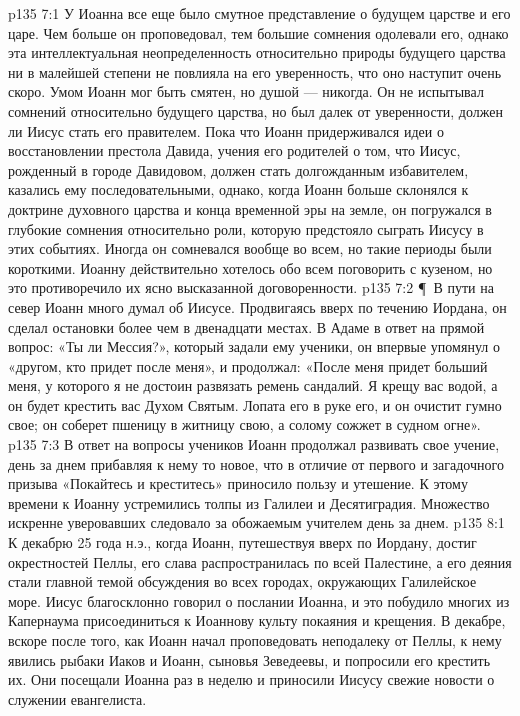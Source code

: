 \vs p135 7:1 У Иоанна все еще было смутное представление о будущем царстве и его царе. Чем больше он проповедовал, тем большие сомнения одолевали его, однако эта интеллектуальная неопределенность относительно природы будущего царства ни в малейшей степени не повлияла на его уверенность, что оно наступит очень скоро. Умом Иоанн мог быть смятен, но душой --- никогда. Он не испытывал сомнений относительно будущего царства, но был далек от уверенности, должен ли Иисус стать его правителем. Пока что Иоанн придерживался идеи о восстановлении престола Давида, учения его родителей о том, что Иисус, рожденный в городе Давидовом, должен стать долгожданным избавителем, казались ему последовательными, однако, когда Иоанн больше склонялся к доктрине духовного царства и конца временной эры на земле, он погружался в глубокие сомнения относительно роли, которую предстояло сыграть Иисусу в этих событиях. Иногда он сомневался вообще во всем, но такие периоды были короткими. Иоанну действительно хотелось обо всем поговорить с кузеном, но это противоречило их ясно высказанной договоренности.
\vs p135 7:2 \P\ В пути на север Иоанн много думал об Иисусе. Продвигаясь вверх по течению Иордана, он сделал остановки более чем в двенадцати местах. В Адаме в ответ на прямой вопрос: «Ты ли Мессия?», который задали ему ученики, он впервые упомянул о «другом, кто придет после меня», и продолжал: «После меня придет больший меня, у которого я не достоин развязать ремень сандалий. Я крещу вас водой, а он будет крестить вас Духом Святым. Лопата его в руке его, и он очистит гумно свое; он соберет пшеницу в житницу свою, а солому сожжет в судном огне».
\vs p135 7:3 В ответ на вопросы учеников Иоанн продолжал развивать свое учение, день за днем прибавляя к нему то новое, что в отличие от первого и загадочного призыва «Покайтесь и креститесь» приносило пользу и утешение. К этому времени к Иоанну устремились толпы из Галилеи и Десятиградия. Множество искренне уверовавших следовало за обожаемым учителем день за днем.
\vs p135 8:1 К декабрю 25 года н.э., когда Иоанн, путешествуя вверх по Иордану, достиг окрестностей Пеллы, его слава распространилась по всей Палестине, а его деяния стали главной темой обсуждения во всех городах, окружающих Галилейское море. Иисус благосклонно говорил о послании Иоанна, и это побудило многих из Капернаума присоединиться к Иоаннову культу покаяния и крещения. В декабре, вскоре после того, как Иоанн начал проповедовать неподалеку от Пеллы, к нему явились рыбаки Иаков и Иоанн, сыновья Зеведеевы, и попросили его крестить их. Они посещали Иоанна раз в неделю и приносили Иисусу свежие новости о служении евангелиста.
